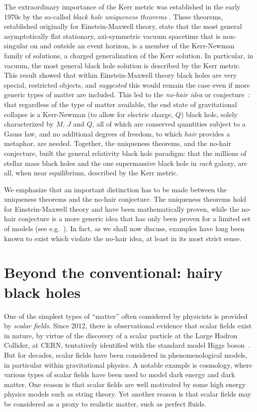 The extraordinary importance of the Kerr metric was established in the early 1970s by the so-called \textit{black hole uniqueness theorems} \cite{Robinson:2004zz}.
These theorems, established originally for Einstein-Maxwell theory, state that the most general asymptotically flat stationary, axi-symmetric vacuum spacetime that is non-singular on and outside an event horizon, is a member of the Kerr-Newman family of solutions, a charged generalization of the Kerr solution.
In particular, in vacuum, the most general black hole solution is described by the Kerr metric.
This result showed that within Einstein-Maxwell theory black holes are very special, restricted objects, and \textit{suggested} this would remain the case even if more generic types of matter are included.
This led to the \textit{no-hair idea} or conjecture~\cite{Ruffini:1971bza}: that regardless of the type of matter available, the end state of gravitational collapse is a Kerr-Newman (to allow for electric charge, $Q$) black hole, solely characterized by $M$, $J$ and $Q$, all of which are conserved quantities subject to a Gauss law, and no additional degrees of freedom, to which \textit{hair} provides a metaphor, are needed.
Together, the uniqueness theorems, and the no-hair conjecture, built the general relativity black hole paradigm: that the millions of stellar mass black holes and the one supermassive black hole in \textit{each} galaxy, are all, when near equilibrium, described by the Kerr metric.  

We emphasize that an important distinction has to be made between the uniqueness theorems and the no-hair conjecture.
The uniqueness theorems hold for Einstein-Maxwell theory and have been mathematically proven, while the no-hair conjecture is a more generic idea that has only been proven for a limited set of models (see e.g.~\cite{Bekenstein:1996pn}).
In fact, as we shall now discuss, examples have long been known to exist which violate the no-hair idea, at least in its most strict sense.
\section{Beyond the conventional: hairy black holes}
\label{sec:bh_beyond_gr}

One of the simplest types of ``matter'' often considered by physicists is provided by \textit{scalar fields}.
Since 2012, there is observational evidence that scalar fields exist in nature, by virtue of the discovery of a scalar particle at the Large Hadron Collider, at CERN, tentatively identified with the standard model Higgs boson~\cite{Aad:2012tfa,Chatrchyan:2012ufa}.
But for decades, scalar fields have been considered in phenomenological models, in particular within gravitational physics.
A notable example is cosmology, where various types of scalar fields have been used to model dark energy and dark matter.
One reason is that scalar fields are well motivated by some high energy physics models such as string theory.
Yet another reason is that scalar fields may be considered as a proxy to realistic matter, such as perfect fluids.


